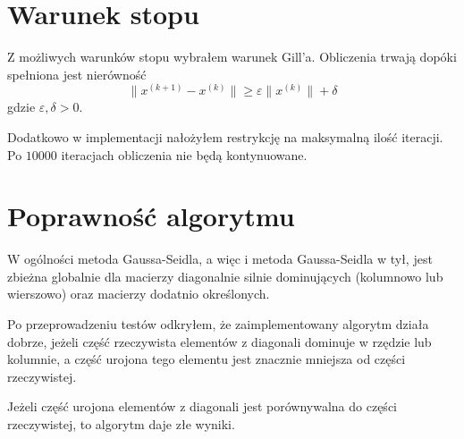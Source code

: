 \documentclass[12pt]{article}
\begin{document}
	\section{Warunek stopu}
	Z możliwych warunków stopu wybrałem warunek Gill'a. Obliczenia trwają dopóki spełniona jest nierówność
	$$
		\|x^{(k+1)} - x^{(k)}\| \geq \varepsilon \|x^{(k)}\| + \delta
	$$
	gdzie $\varepsilon, \delta > 0$.
	
	Dodatkowo w implementacji nałożyłem restrykcję na maksymalną ilość iteracji. Po $10000$ iteracjach obliczenia nie będą kontynuowane.
	
	\section{Poprawność algorytmu}
	W ogólności metoda Gaussa-Seidla, a więc i metoda Gaussa-Seidla w tył, jest zbieżna globalnie dla macierzy diagonalnie silnie dominujących (kolumnowo lub wierszowo) oraz macierzy dodatnio określonych.
	
	Po przeprowadzeniu testów odkryłem, że zaimplementowany algorytm działa dobrze, jeżeli część rzeczywista elementów z diagonali dominuje w rzędzie lub kolumnie, a część urojona tego elementu jest znacznie mniejsza od części rzeczywistej.
	
	Jeżeli część urojona elementów z diagonali jest porównywalna do części rzeczywistej, to algorytm daje złe wyniki.
	
\end{document}
